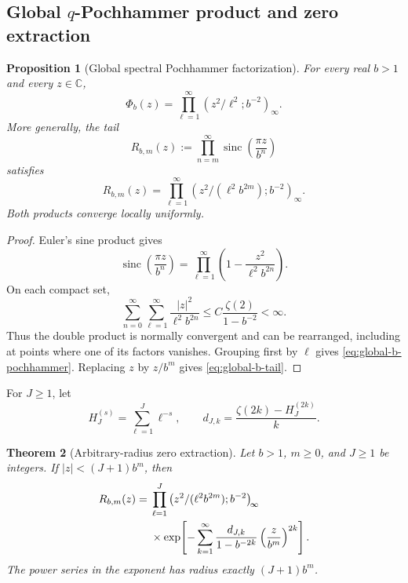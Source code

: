 \documentclass[11pt,oneside]{article}
\numberwithin{equation}{section}
\newtheorem{theorem}{Theorem}[section]
\newtheorem{proposition}[theorem]{Proposition}
\theoremstyle{definition}
\theoremstyle{remark}
\newcommand{\C}{\mathbb C}
\newcommand{\sinc}{\operatorname{sinc}}
\newcommand{\qpoch}[2]{\left(#1;#2\right)_{\!\infty}}
\newcommand{\defeq}{\mathrel{:=}}
\begin{document}
\subsection{Global \texorpdfstring{\(q\)}{q}-Pochhammer product and zero extraction}

\begin{proposition}[Global spectral Pochhammer factorization]
\label{prop:global-b-pochhammer}
For every real \(b>1\) and every \(z\in\C\),
\begin{equation}
 \Phi_b(z)
 =\prod_{\ell=1}^{\infty}
   \qpoch{z^2/\ell^2}{b^{-2}}.
 \label{eq:global-b-pochhammer}
\end{equation}
More generally, the tail
\[
 R_{b,m}(z)\defeq\prod_{n=m}^{\infty}
 \sinc\!\left(\frac{\pi z}{b^n}\right)
\]
satisfies
\begin{equation}
 R_{b,m}(z)
 =\prod_{\ell=1}^{\infty}
   \qpoch{z^2/(\ell^2b^{2m})}{b^{-2}}.
 \label{eq:global-b-tail}
\end{equation}
Both products converge locally uniformly.
\end{proposition}

\begin{proof}
Euler's sine product gives
\[
 \sinc\!\left(\frac{\pi z}{b^n}\right)
 =\prod_{\ell=1}^{\infty}
  \left(1-\frac{z^2}{\ell^2b^{2n}}\right).
\]
On each compact set,
\[
 \sum_{n=0}^{\infty}\sum_{\ell=1}^{\infty}
 \frac{|z|^2}{\ell^2b^{2n}}
 \le C\frac{\zeta(2)}{1-b^{-2}}<\infty.
\]
Thus the double product is normally convergent and can be rearranged, including at points
where one of its factors vanishes.  Grouping first by \(\ell\) gives
\eqref{eq:global-b-pochhammer}.  Replacing \(z\) by \(z/b^m\) gives
\eqref{eq:global-b-tail}.
\end{proof}

For \(J\ge1\), let
\[
 H_J^{(s)}=\sum_{\ell=1}^{J}\ell^{-s},
 \qquad
 d_{J,k}=\frac{\zeta(2k)-H_J^{(2k)}}{k}.
\]

\begin{theorem}[Arbitrary-radius zero extraction]
\label{thm:arbitrary-zero-extraction}
Let \(b>1\), \(m\ge0\), and \(J\ge1\) be integers.  If
\(|z|<(J+1)b^m\), then
\begin{align}
 R_{b,m}(z)
 ={}&\prod_{\ell=1}^{J}
 \qpoch{z^2/(\ell^2b^{2m})}{b^{-2}}\notag\\
 &\times\exp\!\left[-\sum_{k=1}^{\infty}
  \frac{d_{J,k}}{1-b^{-2k}}
  \left(\frac{z}{b^m}\right)^{2k}\right].
 \label{eq:arbitrary-zero-extraction}
\end{align}
The power series in the exponent has radius exactly \((J+1)b^m\).
\end{theorem}
\end{document}
